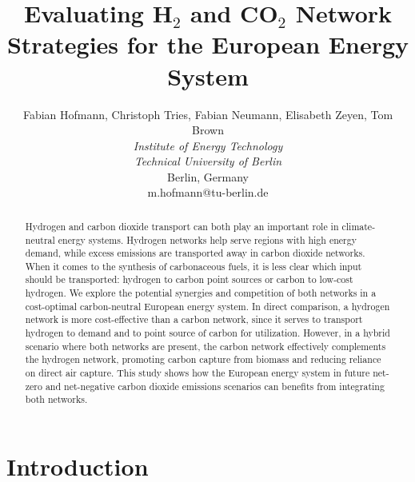\documentclass[twocolumn]{article}
\newcommand{\COtwo}{CO$_2$}
\newcommand{\Htwo}{H$_2$}
\begin{document}

\title{Evaluating \Htwo{} and \COtwo{} Network Strategies for the European Energy System}



\author{
    Fabian Hofmann, Christoph Tries, Fabian Neumann, Elisabeth Zeyen, Tom Brown \\
    \textit{Institute of Energy Technology} \\
    \textit{Technical University of Berlin}\\
    Berlin, Germany \\
    m.hofmann@tu-berlin.de
}


\maketitle

\begin{abstract}
    Hydrogen and carbon dioxide transport can both play an important role in climate-neutral energy systems. Hydrogen networks help serve regions with high energy demand, while excess emissions are transported away in carbon dioxide networks. When it comes to the synthesis of carbonaceous fuels, it is less clear which input should be transported: hydrogen to carbon point sources or carbon to low-cost hydrogen. We explore the potential synergies and competition of both networks in a cost-optimal carbon-neutral European energy system. In direct comparison, a hydrogen network is more cost-effective than a carbon network, since it serves to transport hydrogen to demand and to point source of carbon for utilization. However, in a hybrid scenario where both networks are present, the carbon network effectively complements the hydrogen network, promoting carbon capture from biomass and reducing reliance on direct air capture. This study shows how the European energy system in future net-zero and net-negative carbon dioxide emissions scenarios can benefits from integrating both networks.
\end{abstract}


\section{Introduction}
\end{document}
